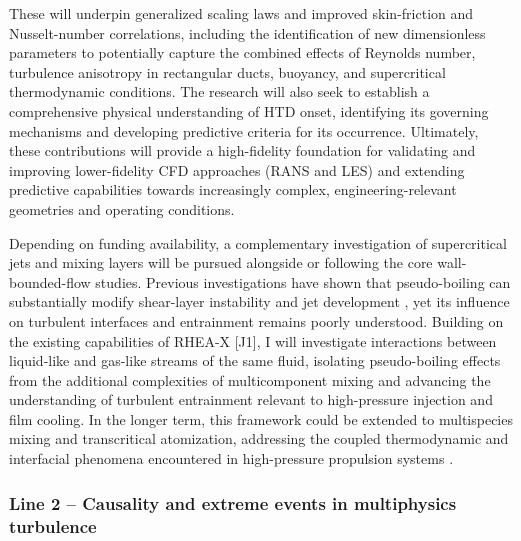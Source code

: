 \documentclass[11pt]{article}
\begin{document}
These will underpin generalized scaling laws and improved skin-friction and Nusselt-number correlations, including the identification of new dimensionless parameters to potentially capture the combined effects of Reynolds number, turbulence anisotropy in rectangular ducts, buoyancy, and supercritical thermodynamic conditions.
The research will also seek to establish a comprehensive physical understanding of HTD onset, identifying its governing mechanisms and developing predictive criteria for its occurrence.
Ultimately, these contributions will provide a high-fidelity foundation for validating and improving lower-fidelity CFD approaches (RANS and LES) and extending predictive capabilities towards increasingly complex, engineering-relevant geometries and operating conditions.

Depending on funding availability, a complementary investigation of supercritical jets and mixing layers will be pursued alongside or following the core wall-bounded-flow studies.
Previous investigations have shown that pseudo-boiling can substantially modify shear-layer instability and jet development \cite{Lapenna2019,SharanBellan2021}, yet its influence on turbulent interfaces and entrainment remains poorly understood.
Building on the existing capabilities of RHEA-X [J1], I will investigate interactions between liquid-like and gas-like streams of the same fluid, isolating pseudo-boiling effects from the additional complexities of multicomponent mixing and advancing the understanding of turbulent entrainment relevant to high-pressure injection and film cooling.
In the longer term, this framework could be extended to multispecies mixing and transcritical atomization, addressing the coupled thermodynamic and interfacial phenomena encountered in high-pressure propulsion systems \cite{JofreUrzay2021}.

\subsubsection{Line 2 -- Causality and extreme events in multiphysics turbulence}
\end{document}
